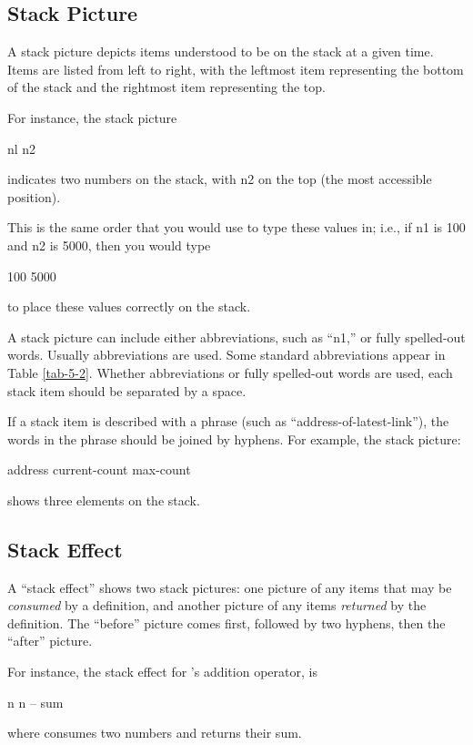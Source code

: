 \subsection{Stack Picture}%

A stack picture depicts items understood to be on the stack at a given
time.  Items are listed from left to right, with the leftmost item
representing the bottom of the stack and the rightmost item
representing the top.

For instance, the stack picture
\begin{Code}
nl n2
\end{Code}
indicates two numbers on the stack, with n2 on the top (the most
accessible position).

This is the same order that you would use to type these values in;
i.e., if n1 is 100 and n2 is 5000, then you would type
\begin{Code}
100 5000
\end{Code}
to place these values correctly on the stack.

A stack picture can include either abbreviations, such as ``n1,'' or
fully spelled-out words.  Usually abbreviations are used.  Some
standard abbreviations appear in Table \ref{tab-5-2}.  Whether
abbreviations or fully spelled-out words are used, each stack item
should be separated by a space.

If a stack item is described with a phrase (such as
``address-of-latest-link''), the words in the phrase should be joined
by hyphens.  For example, the stack picture:
\begin{Code}
address current-count max-count
\end{Code}
shows three elements on the stack.%

\subsection{Stack Effect}%

A ``stack effect'' shows two stack pictures: one picture of any items
that may be \emph{consumed} by a definition, and another picture of
any items \emph{returned} by the definition.  The ``before'' picture
comes first, followed by two hyphens, then the ``after'' picture.

For instance, the stack effect for \Forth{}'s addition operator,
\forth{+} is
\begin{Code}
n n -- sum
\end{Code}
where \forth{+} consumes two numbers and returns their sum.

